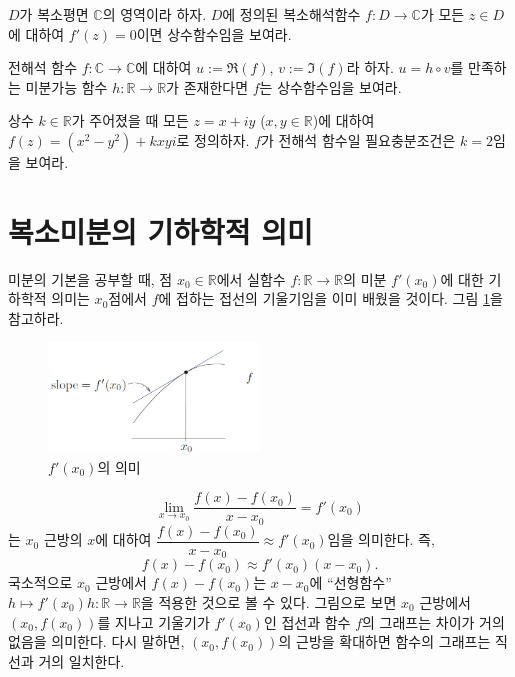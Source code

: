 \begin{salt_exercise} \label{ex-2-13}
$D$가 복소평면 $\mathbb C$의 영역이라 하자.
$D$에 정의된 복소해석함수 $f:D\to\mathbb C$가 
모든  $z\in D$에 대하여 $f'(z)=0$이면
상수함수임을 보여라.
\end{salt_exercise}

\begin{salt_exercise} \label{ex-2-14}
전해석 함수 $f:\mathbb C \to \mathbb C$에 대하여
$u:=\Re(f)$, $v:=\Im(f)$라 하자.
$u= h\circ v$를 만족하는 미분가능 함수 $h:\mathbb R \to \mathbb R$가
존재한다면 $f$는 상수함수임을 보여라.
\end{salt_exercise}

\begin{salt_exercise} \label{ex-2-15}
상수 $k\in\mathbb R$가 주어졌을 때
모든 $z=x+iy$ ($x,y\in \mathbb R$)에 대하여 $f(z)=(x^2-y^2) +kxyi$로 정의하자.
$f$가 전해석 함수일 필요충분조건은 $k=2$임을 보여라.
\end{salt_exercise}

\section{복소미분의 기하학적 의미\label{sec-2-3}}

미분의 기본을 공부할 때, 점 $x_0\in\mathbb R$에서 실함수 $f:\mathbb R\to \mathbb R$의 
미분 $f'(x_0)$에 대한 기하학적 의미는 $x_0$점에서 $f$에 접하는 접선의 기울기임을
이미 배웠을 것이다. 그림 \ref{fig-2-8}을 참고하라.

\begin{figure}[!h]
\begin{center}
\includegraphics[width=0.5\textwidth]{./SaltChapter/figs/fig-2-8}
\end{center}
\caption{$f'(x_0)$의 의미}
\label{fig-2-8}
\end{figure}

\[
\lim\limits_{x\to x_0} \dfrac{f(x) - f(x_0)}{x-x_0} = f'(x_0)
\]
는
$x_0$ 근방의 $x$에 대하여
$\dfrac{f(x) - f(x_0)}{x-x_0} \approx f'(x_0)$임을 의미한다. 즉,
\[
f(x) - f(x_0) \approx f'(x_0)(x-x_0).
\]
국소적으로 $x_0$ 근방에서 $f(x)-f(x_0)$는 $x-x_0$에 ``선형함수''
$h \mapsto f'(x_0)h : \mathbb R \to \mathbb R$을 적용한 것으로 볼 수 있다.
그림으로 보면 $x_0$ 근방에서 
$(x_0, f(x_0))$를 지나고 기울기가 $f'(x_0)$인 접선과 함수 $f$의 그래프는 차이가 거의 없음을 
의미한다. 
다시 말하면, $(x_0, f(x_0))$의 근방을 확대하면  함수의 그래프는 직선과 거의 일치한다.

